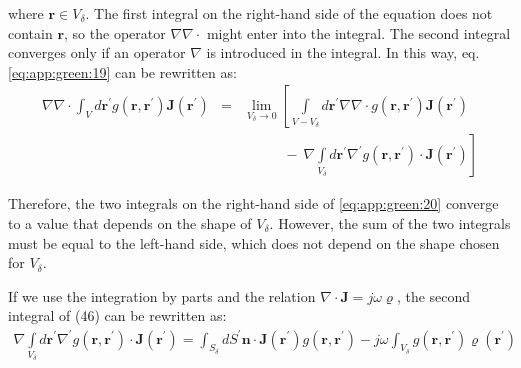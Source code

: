 			\noindent where $\mathbf{r}\in V_{\delta}$. The first integral on the right-hand side of the equation does not contain $\mathbf{r}$, so the operator $\nabla\nabla\cdot$ might enter into the integral. The second integral converges only if an operator $\nabla$ is introduced in the integral. In this way, eq.\eqref{eq:app:green:19} can be rewritten as:
			\begin{eqnarray}
				\nabla\nabla\cdot\int_V d\mathbf{r^\prime} g(\mathbf{r},\mathbf{r^\prime})\mathbf{J}(\mathbf{r^\prime}) &=& \lim\limits_{V_\delta\rightarrow0} \left[\int\limits_{V-V_\delta} d\mathbf{r^\prime} \nabla\nabla\cdot g(\mathbf{r},\mathbf{r^\prime})\mathbf{J}(\mathbf{r^\prime})\right.\nonumber \\ &&\left.~~~~~~~~~~~~~-~\nabla\int\limits_{V_\delta} d\mathbf{r^\prime} \nabla^\prime g(\mathbf{r},\mathbf{r^\prime})\cdot\mathbf{J}(\mathbf{r^\prime})\right] \label{eq:app:green:20}
			\end{eqnarray}
		
			Therefore, the two integrals on the right-hand side of \eqref{eq:app:green:20} converge to a value that depends on the shape of $V_\delta$. However, the sum of the two integrals must be equal to the left-hand side, which does not depend on the shape chosen for $V_\delta$.
			
			If we use the integration by parts and the relation $\nabla\cdot\mathbf{J}=j\omega\varrho$, the second integral of (46) can be rewritten as:
			\begin{eqnarray}
				\nabla\int\limits_{V_\delta} d\mathbf{r^\prime} \nabla^\prime g(\mathbf{r},\mathbf{r^\prime})\cdot\mathbf{J}(\mathbf{r^\prime}) = \int_{S_\delta} dS^\prime \mathbf{n}\cdot\mathbf{J}(\mathbf{r^\prime})g(\mathbf{r},\mathbf{r^\prime}) - j\omega\int_{V_\delta} g(\mathbf{r},\mathbf{r^\prime})\varrho(\mathbf{r^\prime}) \label{eq:app:green:21}
			\end{eqnarray}
		
